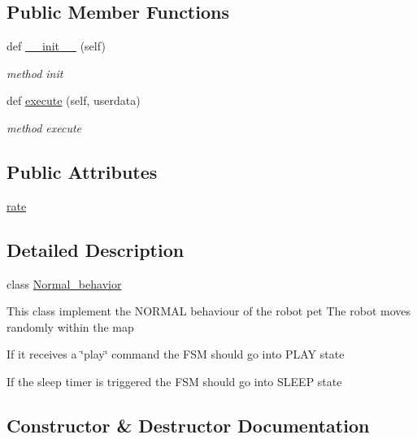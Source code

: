 \subsection*{Public Member Functions}
\begin{DoxyCompactItemize}
\item 
def \hyperlink{classbehavior__manager_1_1Normal__behavior_a7ab22900e936fc3921a269389b51e6ab}{\+\_\+\+\_\+init\+\_\+\+\_\+} (self)
\begin{DoxyCompactList}\small\item\em method init \end{DoxyCompactList}\item 
def \hyperlink{classbehavior__manager_1_1Normal__behavior_a15faab6a43a39510355baad4faaa808a}{execute} (self, userdata)
\begin{DoxyCompactList}\small\item\em method execute \end{DoxyCompactList}\end{DoxyCompactItemize}
\subsection*{Public Attributes}
\begin{DoxyCompactItemize}
\item 
\hyperlink{classbehavior__manager_1_1Normal__behavior_a8c0881c34370caec4f5298f0ebe35489}{rate}
\end{DoxyCompactItemize}


\subsection{Detailed Description}
class \hyperlink{classbehavior__manager_1_1Normal__behavior}{Normal\+\_\+behavior} 

This class implement the N\+O\+R\+M\+AL behaviour of the robot pet The robot moves randomly within the map
\begin{DoxyItemize}
\item If it receives a \char`\"{}play\char`\"{} command the F\+SM should go into P\+L\+AY state
\item If the sleep timer is triggered the F\+SM should go into S\+L\+E\+EP state 
\end{DoxyItemize}

\subsection{Constructor \& Destructor Documentation}

